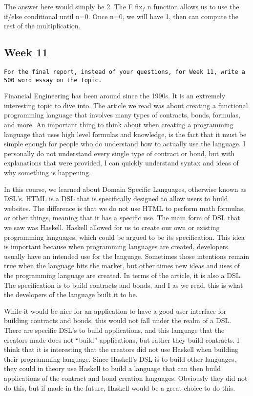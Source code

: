 \documentclass{article}
\theoremstyle{theorem}
\theoremstyle{definition}
\theoremstyle{remark}
\begin{document}
The answer here would simply be 2. The F fix$_f$ n function allows us to use the if/else conditional until n=0. Once n=0, we will have 1, then can compute the rest of the multiplication.


\subsection{Week 11}

\begin{verbatim}
For the final report, instead of your questions, for Week 11, write a 500 word essay on the topic.
\end{verbatim}

\noindent\newline Financial Engineering has been around since the 1990s. It is an extremely interesting topic to dive into. The article we read was about creating a functional programming language that involves many types of contracts, bonds, formulas, and more. An important thing to think about when creating a programming language that uses high level formulas and knowledge, is the fact that it must be simple enough for people who do understand how to actually use the language. I personally do not understand every single type of contract or bond, but with explanations that were provided, I can quickly understand syntax and ideas of why something is happening. 

\noindent\newline In this course, we learned about Domain Specific Languages, otherwise known as DSL’s. HTML is a DSL that is specifically designed to allow users to build websites. The difference is that we do not use HTML to perform math formulas, or other things, meaning that it has a specific use. The main form of DSL that we saw was Haskell. Haskell allowed for us to create our own or existing programming languages, which could be argued to be its specification. This idea is important because when programming languages are created, developers usually have an intended use for the language. Sometimes those intentions remain true when the language hits the market, but other times new ideas and uses of the programming language are created. In terms of the article, it is also a DSL. The specification is to build contracts and bonds, and I as we read, this is what the developers of the language built it to be. 

\noindent\newline While it would be nice for an application to have a good user interface for building contracts and bonds, this would not fall under the realm of a DSL. There are specific DSL’s to build applications, and this language that the creators made does not “build” applications, but rather they build contracts. I think that it is interesting that the creators did not use Haskell when building their programming language. Since Haskell’s DSL is to build other languages, they could in theory use Haskell to build a language that can then build applications of the contract and bond creation languages. Obviously they did not do this, but if made in the future, Haskell would be a great choice to do this.
\end{document}
